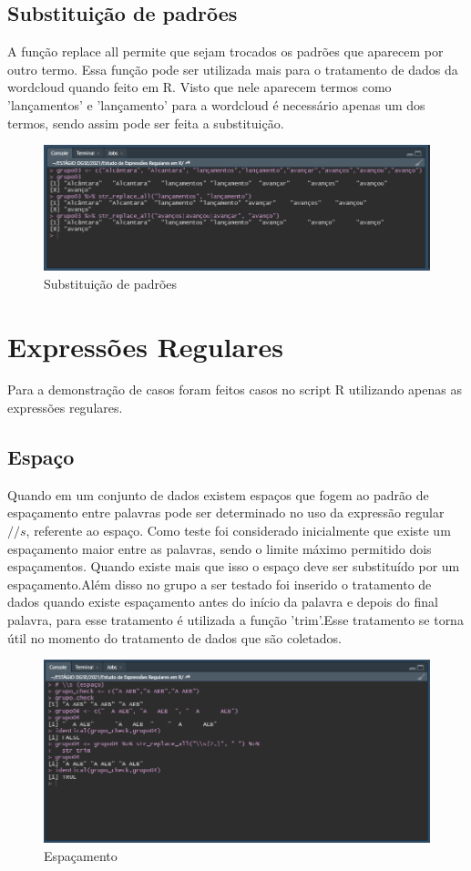 \documentclass[a4paper]{article}
\begin{document}
\subsection{Substituição de padrões}
A função replace all permite que sejam trocados os padrões que aparecem por outro termo. Essa função pode ser utilizada mais para o tratamento de dados da wordcloud quando feito em R. Visto que nele aparecem termos como 'lançamentos' e 'lançamento' para a wordcloud é necessário apenas um dos termos, sendo assim pode ser feita a substituição.
\begin{figure}[htb!]
    \centering
    \includegraphics[width=0.7\linewidth]{style/image/caso04.png}
    \caption{Substituição de padrões}
    \label{fig:Substituir}
\end{figure}

\section{Expressões Regulares}
Para a demonstração de casos foram feitos casos no script R utilizando apenas as expressões regulares.

\subsection{Espaço}
Quando em um conjunto de dados existem espaços que fogem ao padrão de espaçamento entre palavras pode ser determinado no uso da expressão regular $//s$, referente ao espaço. Como teste foi considerado inicialmente que existe um espaçamento maior entre as palavras, sendo o limite máximo permitido dois espaçamentos. Quando existe mais que isso o espaço deve ser substituído por um espaçamento.Além disso no grupo a ser testado foi inserido o tratamento de dados quando existe espaçamento antes do início da palavra e depois do final palavra, para esse tratamento é utilizada a função 'trim'.Esse tratamento se torna útil no momento do tratamento de dados que são coletados.
\begin{figure}[htb!]
    \centering
    \includegraphics[width=0.7\linewidth]{style/image/caso05.png}
    \caption{Espaçamento}
    \label{fig:S}
\end{figure}
\end{document}
